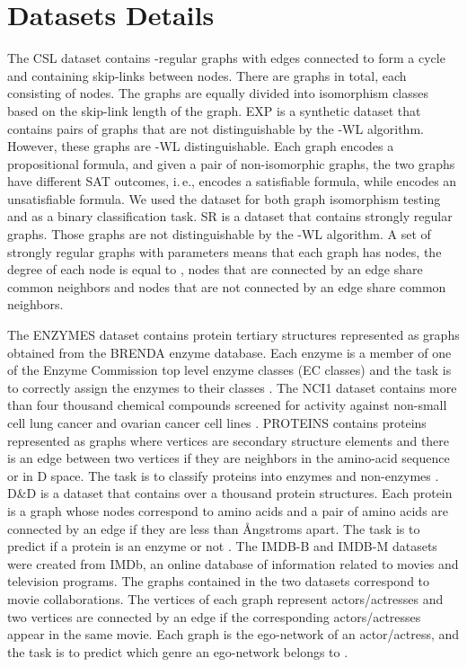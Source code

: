\documentclass{article}
\theoremstyle{plain}
\theoremstyle{definition}
\theoremstyle{remark}
\newcommand{\ie}{i.\,e., }
\begin{document}
\section{Datasets Details}
\label{appendix:datasets}
The CSL dataset contains -regular graphs with edges connected to form a cycle and containing skip-links between nodes.
There are  graphs in total, each consisting of  nodes.
The  graphs are equally divided into  isomorphism classes based on the skip-link length of the graph.
EXP is a synthetic dataset that contains pairs of graphs that are not distinguishable by the -WL algorithm.
However, these graphs are -WL distinguishable.
Each graph encodes a propositional formula, and given a pair  of non-isomorphic graphs, the two graphs have different SAT outcomes, \ie  encodes a satisfiable formula, while  encodes an unsatisfiable formula.
We used the dataset for both graph isomorphism testing and as a binary classification task.
SR is a dataset that contains strongly regular graphs.
Those graphs are not distinguishable by the -WL algorithm.
A set of strongly regular graphs with parameters  means that each graph has  nodes, the degree of each node is equal to , nodes that are connected by an edge share  common neighbors and nodes that are not connected by an edge share  common neighbors.

The ENZYMES dataset contains  protein tertiary structures represented as graphs obtained from the BRENDA enzyme database.
Each enzyme is a member of one of the Enzyme Commission top level enzyme classes (EC classes) and the task is to correctly assign the enzymes to their classes \cite{borgwardt2005protein}.
The NCI1 dataset contains more than four thousand chemical compounds screened for activity against non-small cell lung cancer and ovarian cancer cell lines \cite{wale2008comparison}.
PROTEINS contains proteins represented as graphs where vertices are secondary structure elements and there is an edge between two vertices if they are neighbors in the amino-acid sequence or in D space.
The task is to classify proteins into enzymes and non-enzymes \cite{borgwardt2005protein}. 
D\&D is a dataset that contains over a thousand protein structures.
Each protein is a graph whose nodes correspond to amino acids and a pair of amino acids are connected by an edge if they are less than  \AA ngstroms apart.
The task is to predict if a protein is an enzyme or not \cite{dobson2003distinguishing}.
The IMDB-B and IMDB-M datasets were created from IMDb, an online database of information related to movies and television programs. 
The graphs contained in the two datasets correspond to movie collaborations.
The vertices of each graph represent actors/actresses and two vertices are connected by an edge if the corresponding actors/actresses appear in the same movie.
Each graph is the ego-network of an actor/actress, and the task is to predict which genre an ego-network belongs to \cite{yanardag2015deep}.
\end{document}
